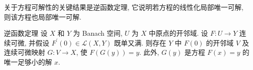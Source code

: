 关于方程可解性的关键结果是逆函数定理, 它说明若方程的线性化局部唯一可解, 则该方程也局部唯一可解.

\begin{Theorem}{逆函数定理}
\label{thm:banach-inverse-function}
设 $X$ 和 $Y$ 为 Banach 空间, $U$ 为 $X$ 中原点的开邻域. 设 $F:U\to Y$ 连续可微, 并假设 $F^{\prime}(0)\in\mathcal{L}(X,Y)$ 既单又满. 则存在 $Y$ 中 $F(0)$ 的开邻域 $V$ 及连续可微映射 $G:V\to X$, 使 $F(G(y))=y$. 此外, $G(y)$ 是方程 $F(x)=y$ 的唯一足够小的解 $x$.
\end{Theorem}

\begingroup
\renewcommand{\endProof}{\par\nobreak\hfill$\blacksquare$\par\vspace{0.1cm}}
